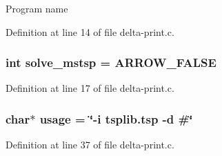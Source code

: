 Program name 

Definition at line 14 of file delta-print.c.\hypertarget{delta-print_8c_786cdab056142ae00a268cabebd5ced7}{
\subsubsection[{solve\_\-mstsp}]{\setlength{\rightskip}{0pt plus 5cm}int {\bf solve\_\-mstsp} = ARROW\_\-FALSE}}
\label{delta-print_8c_786cdab056142ae00a268cabebd5ced7}




Definition at line 17 of file delta-print.c.\hypertarget{delta-print_8c_adebe2487a2c5240ab6cd02c83add0bf}{
\subsubsection[{usage}]{\setlength{\rightskip}{0pt plus 5cm}char$\ast$ {\bf usage} = \char`\"{}-i tsplib.tsp -d \#\char`\"{}}}
\label{delta-print_8c_adebe2487a2c5240ab6cd02c83add0bf}




Definition at line 37 of file delta-print.c.
